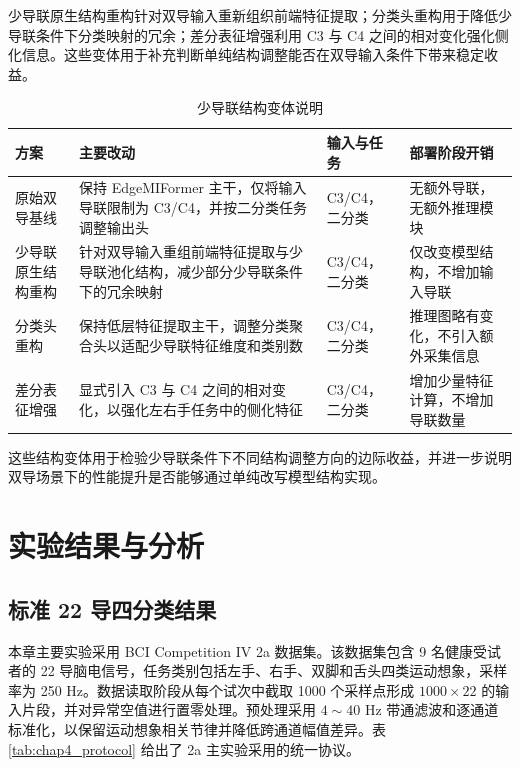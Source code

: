 少导联原生结构重构针对双导输入重新组织前端特征提取；分类头重构用于降低少导联条件下分类映射的冗余；差分表征增强利用 C3 与 C4 之间的相对变化强化侧化信息。这些变体用于补充判断单纯结构调整能否在双导输入条件下带来稳定收益。

\begin{table}[htbp]
    \centering
    \small
    \caption{少导联结构变体说明}
    \label{tab:lowchannel_variant_design}
    \begin{tabularx}{\textwidth}{p{3.0cm}p{4.1cm}p{2.3cm}>{\raggedright\arraybackslash}X}
        \hline
        方案 & 主要改动 & 输入与任务 & 部署阶段开销 \\
        \hline
        原始双导基线 & 保持 EdgeMIFormer 主干，仅将输入导联限制为 C3/C4，并按二分类任务调整输出头 & C3/C4，二分类 & 无额外导联，无额外推理模块 \\
        少导联原生结构重构 & 针对双导输入重组前端特征提取与少导联池化结构，减少部分少导联条件下的冗余映射 & C3/C4，二分类 & 仅改变模型结构，不增加输入导联 \\
        分类头重构 & 保持低层特征提取主干，调整分类聚合头以适配少导联特征维度和类别数 & C3/C4，二分类 & 推理图略有变化，不引入额外采集信息 \\
        差分表征增强 & 显式引入 C3 与 C4 之间的相对变化，以强化左右手任务中的侧化特征 & C3/C4，二分类 & 增加少量特征计算，不增加导联数量 \\
        \hline
    \end{tabularx}
\end{table}

这些结构变体用于检验少导联条件下不同结构调整方向的边际收益，并进一步说明双导场景下的性能提升是否能够通过单纯改写模型结构实现。

\section{实验结果与分析}
\subsection{标准 22 导四分类结果}
本章主要实验采用 BCI Competition IV 2a 数据集。该数据集包含 9 名健康受试者的 22 导脑电信号，任务类别包括左手、右手、双脚和舌头四类运动想象，采样率为 250 Hz。数据读取阶段从每个试次中截取 1000 个采样点形成 $1000 \times 22$ 的输入片段，并对异常空值进行置零处理。预处理采用 $4\sim40$ Hz 带通滤波和逐通道标准化，以保留运动想象相关节律并降低跨通道幅值差异。表 \ref{tab:chap4_protocol} 给出了 2a 主实验采用的统一协议。

